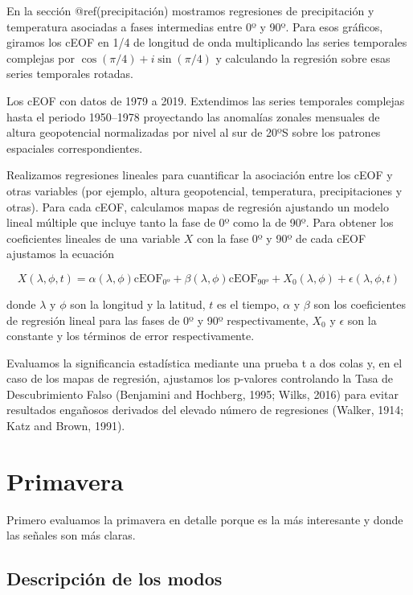 \documentclass[12pt,oneside]{reedthesis}
\begin{document}
En la sección @ref(precipitación) mostramos regresiones de precipitación y temperatura asociadas a fases intermedias entre 0º y 90º.
Para esos gráficos, giramos los cEOF en 1/4 de longitud de onda multiplicando las series temporales complejas por \(\cos(\pi/4) + i\sin(\pi/4)\) y calculando la regresión sobre esas series temporales rotadas.

Los cEOF con datos de 1979 a 2019.
Extendimos las series temporales complejas hasta el periodo 1950--1978 proyectando las anomalías zonales mensuales de altura geopotencial normalizadas por nivel al sur de 20ºS sobre los patrones espaciales correspondientes.

Realizamos regresiones lineales para cuantificar la asociación entre los cEOF y otras variables (por ejemplo, altura geopotencial, temperatura, precipitaciones y otras).
Para cada cEOF, calculamos mapas de regresión ajustando un modelo lineal múltiple que incluye tanto la fase de 0º como la de 90º.
Para obtener los coeficientes lineales de una variable \(X\) con la fase 0º y 90º de cada cEOF ajustamos la ecuación

\[
X(\lambda, \phi, t) = \alpha(\lambda, \phi) \operatorname{cEOF_{0º}} + \beta(\lambda, \phi) \operatorname{cEOF_{90º}} + X_0(\lambda, \phi) + \epsilon(\lambda, \phi, t)
\]

donde \(\lambda\) y \(\phi\) son la longitud y la latitud, \(t\) es el tiempo, \(\alpha\) y \(\beta\) son los coeficientes de regresión lineal para las fases de 0º y 90º respectivamente, \(X_0\) y \(\epsilon\) son la constante y los términos de error respectivamente.

Evaluamos la significancia estadística mediante una prueba t a dos colas y, en el caso de los mapas de regresión, ajustamos los p-valores controlando la Tasa de Descubrimiento Falso (Benjamini and Hochberg, 1995; Wilks, 2016) para evitar resultados engañosos derivados del elevado número de regresiones (Walker, 1914; Katz and Brown, 1991).

\hypertarget{primavera}{%
\section{Primavera}\label{primavera}}

Primero evaluamos la primavera en detalle porque es la más interesante y donde las señales son más claras.

\hypertarget{descripciuxf3n-de-los-modos}{%
\subsection{Descripción de los modos}\label{descripciuxf3n-de-los-modos}}
\end{document}
